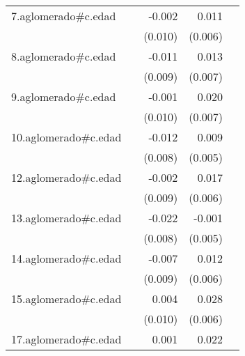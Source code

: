{\begin{longtable}{l*{4}{D{.}{.}{-1}}}
\addlinespace
7.aglomerado#c.edad&                     &      -0.002         &       0.011\sym{*}  &                     \\
            &                     &     (0.010)         &     (0.006)         &                     \\
\addlinespace
8.aglomerado#c.edad&                     &      -0.011         &       0.013\sym{*}  &                     \\
            &                     &     (0.009)         &     (0.007)         &                     \\
\addlinespace
9.aglomerado#c.edad&                     &      -0.001         &       0.020\sym{**} &                     \\
            &                     &     (0.010)         &     (0.007)         &                     \\
\addlinespace
10.aglomerado#c.edad&                     &      -0.012         &       0.009         &                     \\
            &                     &     (0.008)         &     (0.005)         &                     \\
\addlinespace
12.aglomerado#c.edad&                     &      -0.002         &       0.017\sym{**} &                     \\
            &                     &     (0.009)         &     (0.006)         &                     \\
\addlinespace
13.aglomerado#c.edad&                     &      -0.022\sym{**} &      -0.001         &                     \\
            &                     &     (0.008)         &     (0.005)         &                     \\
\addlinespace
14.aglomerado#c.edad&                     &      -0.007         &       0.012         &                     \\
            &                     &     (0.009)         &     (0.006)         &                     \\
\addlinespace
15.aglomerado#c.edad&                     &       0.004         &       0.028\sym{***}&                     \\
            &                     &     (0.010)         &     (0.006)         &                     \\
\addlinespace
17.aglomerado#c.edad&                     &       0.001         &       0.022\sym{**} &                     \\

\end{longtable}}
